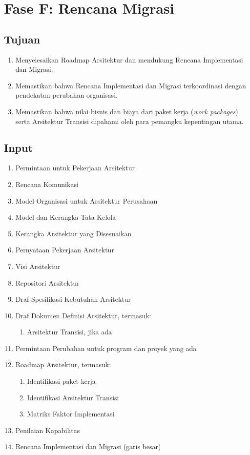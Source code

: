 \chapter{Fase F: Rencana Migrasi}

\section{Tujuan}
\begin{enumerate}
	\item Menyelesaikan Roadmap Arsitektur dan mendukung Rencana Implementasi dan Migrasi.
	\item Memastikan bahwa Rencana Implementasi dan Migrasi terkoordinasi dengan pendekatan perubahan organisasi.
	\item Memastikan bahwa nilai bisnis dan biaya dari paket kerja (\textit{work packages}) serta Arsitektur Transisi dipahami oleh para pemangku kepentingan utama.
\end{enumerate}

\section{Input}
\begin{enumerate}
	\item Permintaan untuk Pekerjaan Arsitektur
	\item Rencana Komunikasi
	\item Model Organisasi untuk Arsitektur Perusahaan
	\item Model dan Kerangka Tata Kelola
	\item Kerangka Arsitektur yang Disesuaikan
	\item Pernyataan Pekerjaan Arsitektur
	\item Visi Arsitektur
	\item Repositori Arsitektur
	\item Draf Spesifikasi Kebutuhan Arsitektur
	\item Draf Dokumen Definisi Arsitektur, termasuk:
	\begin{enumerate}
		\item Arsitektur Transisi, jika ada
	\end{enumerate}
	\item Permintaan Perubahan untuk program dan proyek yang ada
	\item Roadmap Arsitektur, termasuk:
	\begin{enumerate}
		\item Identifikasi paket kerja
		\item Identifikasi Arsitektur Transisi
		\item Matriks Faktor Implementasi
	\end{enumerate}
	\item Penilaian Kapabilitas
	\item Rencana Implementasi dan Migrasi (garis besar)
\end{enumerate}

